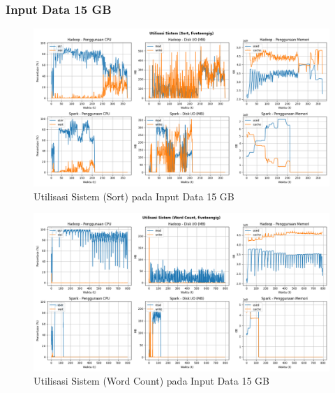 \subsubsection{Input Data 15 GB}
\begin{figure}[h]
    \centering
    \includegraphics[width=1\textwidth]{figures/ch04/5-util-sistem-sort-fiveteengig}
    \caption{Utilisasi Sistem (Sort) pada Input Data 15 GB}
    \label{fig:5-util-sistem-sort-fiveteengig}
\end{figure}

\begin{figure}[h]
    \centering
    \includegraphics[width=1\textwidth]{figures/ch04/5-util-sistem-wordcount-fiveteengig}
    \caption{Utilisasi Sistem (Word Count) pada Input Data 15 GB}
    \label{fig:5-util-sistem-wordcount-fiveteengig}
\end{figure}



